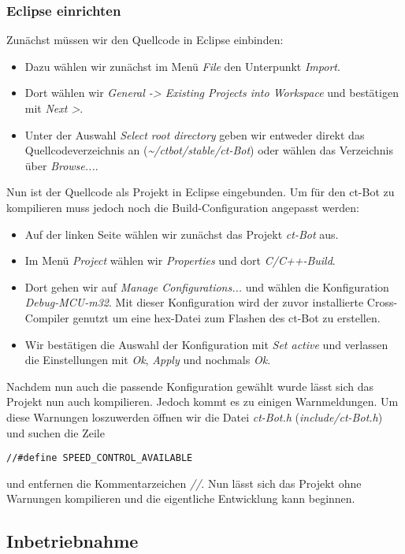\subsubsection{Eclipse einrichten}
Zunächst müssen wir den Quellcode in Eclipse einbinden:
\begin{itemize}
\item Dazu wählen wir zunächst im Menü \textit{File} den Unterpunkt \textit{Import}.
\item Dort wählen wir \textit{General -> Existing Projects into Workspace} und bestätigen mit \textit{Next >}.
\item Unter der Auswahl \textit{Select root directory} geben wir entweder direkt das Quellcodeverzeichnis an (\textit{\~{}/ctbot/stable/ct-Bot}) oder wählen das Verzeichnis über \textit{Browse...}.
\end{itemize}
Nun ist der Quellcode als Projekt in Eclipse eingebunden. Um für den ct-Bot zu kompilieren muss jedoch noch die Build-Configuration angepasst werden:
\begin{itemize}
\item Auf der linken Seite wählen wir zunächst das Projekt \textit{ct-Bot} aus.
\item Im Menü \textit{Project} wählen wir \textit{Properties} und dort \textit{C/C++-Build}.
\item Dort gehen wir auf \textit{Manage Configurations...} und wählen die Konfiguration \textit{Debug-MCU-m32}. Mit dieser Konfiguration wird der zuvor installierte Cross-Compiler genutzt um eine hex-Datei zum Flashen des ct-Bot zu erstellen.
\item Wir bestätigen die Auswahl der Konfiguration mit \textit{Set active} und verlassen die Einstellungen mit \textit{Ok}, \textit{Apply} und nochmals \textit{Ok}.
\end{itemize}
Nachdem nun auch die passende Konfiguration gewählt wurde lässt sich das Projekt nun auch kompilieren. Jedoch kommt es zu einigen Warnmeldungen.
Um diese Warnungen loszuwerden öffnen wir die Datei \textit{ct-Bot.h} (\textit{include/ct-Bot.h}) und suchen die Zeile
\begin{lstlisting}
//#define SPEED_CONTROL_AVAILABLE
\end{lstlisting}
und entfernen die Kommentarzeichen \textit{//}.
Nun lässt sich das Projekt ohne Warnungen kompilieren und die  eigentliche Entwicklung kann beginnen.

\subsection{Inbetriebnahme}
